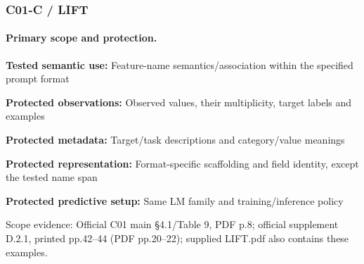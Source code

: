 \documentclass[10pt]{article}
\begin{document}
\subsubsection*{C01-C / LIFT}
\paragraph{Primary scope and protection.}
\textbf{Tested semantic use:} Feature-name semantics/association within the specified prompt format\par
\textbf{Protected observations:} Observed values, their multiplicity, target labels and examples\par
\textbf{Protected metadata:} Target/task descriptions and category/value meanings\par
\textbf{Protected representation:} Format-specific scaffolding and field identity, except the tested name span\par
\textbf{Protected predictive setup:} Same LM family and training/inference policy\par
Scope evidence: Official C01 main §4.1/Table 9, PDF p.8; official supplement D.2.1, printed pp.42--44 (PDF pp.20--22); supplied LIFT.pdf also contains these examples.\par
\end{document}
